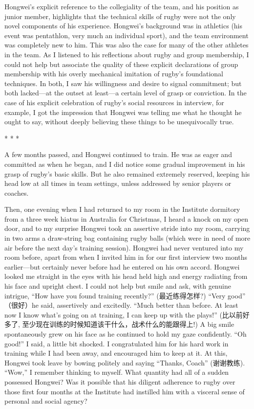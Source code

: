 \begin{CJK}{UTF8}{gbsn}
Hongwei's explicit reference to the collegiality of the team, and his position as junior member, highlights that the technical skills of rugby were not the only novel components of his experience.  Hongwei's background was in athletics (his event was pentathlon, very much an individual sport), and the team environment was completely new to him.  This was also the case for many of the other athletes in the team.  As I listened to his reflections about rugby and group membership, I could not help but associate the quality of these explicit declarations of group membership with his overly mechanical imitation of rugby's foundational techniques.  In both, I saw his willingness and desire to signal commitment; but both lacked---at the outset at least---a certain level of grasp or conviction.  In the case of his explicit celebration of rugby's social resources in interview, for example, I got the impression that Hongwei was telling me what he thought he ought to say, without deeply believing these things to be unequivocally true.


                            \begin{center}
                                * * *
                            \end{center}

A few months passed, and Hongwei continued to train.  He was as eager and committed as when he began, and I did notice some gradual improvement in his grasp of rugby's basic skills.  But he also remained extremely reserved, keeping his head low at all times in team settings, unless addressed by senior players or coaches.

Then, one evening when I had returned to my room in the Institute dormitory from a three week hiatus in Australia for Christmas, I heard a knock on my open door, and to my surprise Hongwei took an assertive stride into my room, carrying in two arms a draw-string bag containing rugby balls (which were in need of more air before the next day's training session).  Hongwei had never ventured into my room before, apart from when I invited him in for our first interview two months earlier---but certainly never before had he entered on his own accord.  Hongwei looked me straight in the eyes with his head held high and energy radiating from his face and upright chest.  I could not help but smile and ask, with genuine intrigue, ``How have you found training recently?'' (最近练得怎样?)
``Very good'' （很好）he said, assertively and excitedly.  ``Much better than before.  At least now I know what's going on at training, I can keep up with the plays!'' (比以前好多了, 至少现在训练的时候知道该干什么，战术什么的能跟得上!) A big smile spontaneously grew on his face as he continued to hold my gaze confidently.  ``Oh good!'' I said, a little bit shocked.  I congratulated him for his hard work in training while I had been away, and encouraged him to keep at it.  At this, Hongwei took leave by bowing politely and saying ``Thanks, Coach'' (谢谢教练).  ``Wow,'' I remember thinking to myself.  What quantity had all of a sudden possessed Hongwei? Was it possible that his diligent adherence to rugby over those first four months at the Institute had instilled him with a visceral sense of personal and social agency?


\end{CJK}
